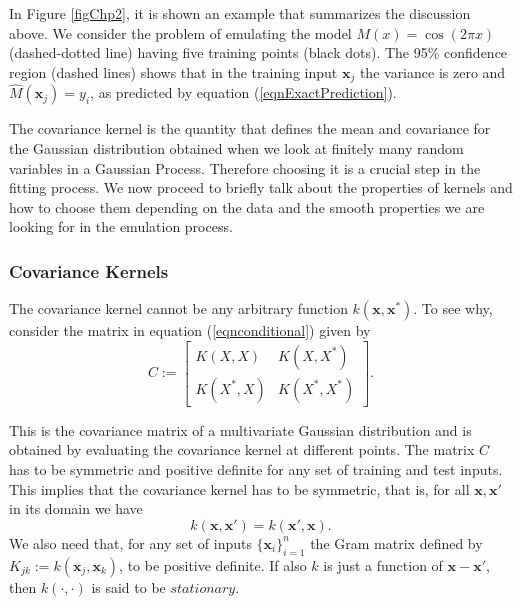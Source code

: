 \documentclass[12pt]{book}
\newcommand{\x}{\textbf{x}}
\begin{document}
In Figure \ref{figChp2}, it is shown an example that summarizes the discussion above.
We consider the problem of emulating the model $M(x)=\cos(2\pi x)$ (dashed-dotted line)
having five training points (black dots). The 95\% confidence region (dashed lines)
shows that in the training input $\x_{j}$  the variance is zero  and $\widehat{M}(\x_{j})=y_{i}$, 
as predicted by equation (\ref{eqnExactPrediction}).
\newline

The covariance kernel is the quantity that defines the mean and covariance for
the Gaussian distribution obtained when we look at finitely many random variables in 
a Gaussian Process. Therefore choosing it
is a crucial step in the fitting process. We now proceed to briefly talk about the properties
of kernels and how to choose them depending on the data and the smooth properties we are looking
for in the emulation process. 

\subsubsection*{Covariance Kernels}
The covariance kernel cannot be any arbitrary function $k(\x,\x^{*})$. To see why, consider  the
matrix in  equation (\ref{eqnconditional}) given by
\begin{equation*}
C:=\begin{bmatrix} K(X,X) & K(X,X^{*}) \\
 K(X^{*},X) & K(X^{*},X^{*}) \end{bmatrix}.
\end{equation*}


This is the covariance matrix of a multivariate Gaussian distribution and is obtained by evaluating
the covariance kernel at different points. The matrix $C$ has to be  symmetric and  positive definite 
for any set of training and test inputs. This implies that the covariance kernel has to be symmetric,
that is, for all $\x,\x'$ in its domain we have
\begin{equation*}
k(\x,\x')=k(\x',\x).
\end{equation*}
We also need that, for  any set of inputs $\{\x_{i}\}_{i=1}^{n}$  the Gram  matrix defined by 
$K_{jk}:=k(\x_{j},\x_{k})$, to be positive definite. If also $k$ is just a function of $\x-\x'$,
then $k(\cdot,\cdot)$ is said to be $\textit{stationary}$.
\end{document}
